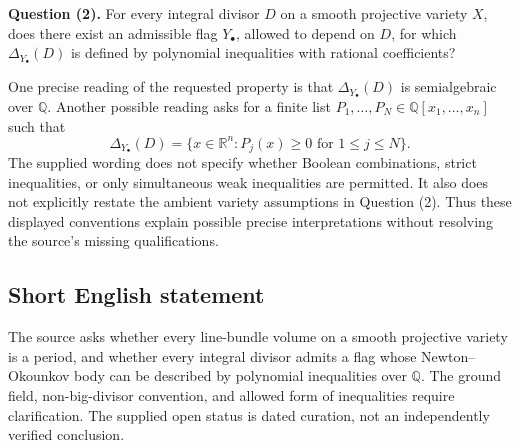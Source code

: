 \documentclass[11pt]{article}
\newcommand{\Q}{\mathbb{Q}}
\newcommand{\R}{\mathbb{R}}
\begin{document}
\textbf{Question (2).} For every integral divisor \(D\) on a smooth projective variety \(X\), does there exist an admissible flag \(Y_\bullet\), allowed to depend on \(D\), for which \(\Delta_{Y_\bullet}(D)\) is defined by polynomial inequalities with rational coefficients?

One precise reading of the requested property is that \(\Delta_{Y_\bullet}(D)\) is semialgebraic over \(\Q\). Another possible reading asks for a finite list \(P_1,\ldots,P_N\in\Q[x_1,\ldots,x_n]\) such that
\[
\Delta_{Y_\bullet}(D)=\{x\in\R^n:P_j(x)\geq0\text{ for }1\leq j\leq N\}.
\]
The supplied wording does not specify whether Boolean combinations, strict inequalities, or only simultaneous weak inequalities are permitted. It also does not explicitly restate the ambient variety assumptions in Question (2). Thus these displayed conventions explain possible precise interpretations without resolving the source's missing qualifications.
\subsection{Short English statement}
The source asks whether every line-bundle volume on a smooth projective variety is a period, and whether every integral divisor admits a flag whose Newton--Okounkov body can be described by polynomial inequalities over \(\Q\). The ground field, non-big-divisor convention, and allowed form of inequalities require clarification. The supplied open status is dated curation, not an independently verified conclusion.
\end{document}
